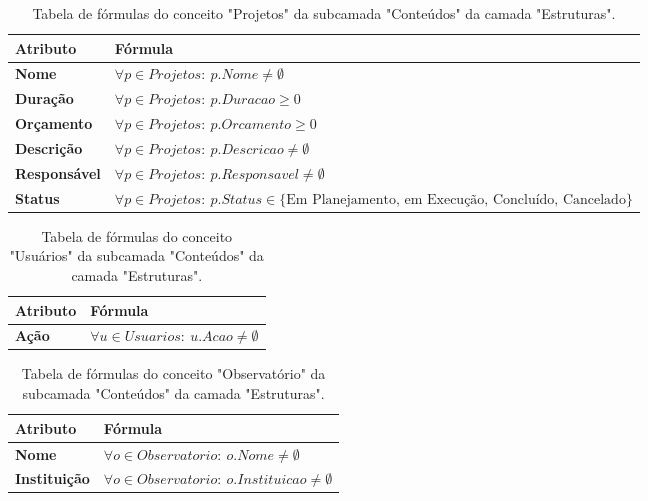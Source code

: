 \begin{apendicesenv}
\begin{table}[H]
\centering
\caption{Tabela de fórmulas do conceito "Projetos" da subcamada "Conteúdos" da camada "Estruturas".}
\begin{tabularx}{\textwidth}{|l|X|}
\hline
\textbf{Atributo} & \textbf{Fórmula} \\ \hline
\textbf{Nome} & $\forall p \in Projetos:\ p.Nome \neq \emptyset$ \\ \hline
\textbf{Duração} & $\forall p \in Projetos:\ p.Duracao \ge 0$ \\ \hline
\textbf{Orçamento} & $\forall p \in Projetos:\ p.Orcamento \ge 0$ \\ \hline
\textbf{Descrição} & $\forall p \in Projetos:\ p.Descricao \neq \emptyset$ \\ \hline
\textbf{Responsável} & $\forall p \in Projetos:\ p.Responsavel \neq \emptyset$ \\ \hline
\textbf{Status} & $\forall p \in Projetos:\ p.Status \in \{\text{Em Planejamento, em Execução, Concluído, Cancelado}\}$ \\ \hline
\end{tabularx}
\end{table}

\begin{table}[H]
\centering
\caption{Tabela de fórmulas do conceito "Usuários" da subcamada "Conteúdos" da camada "Estruturas".}
\begin{tabularx}{\textwidth}{|l|X|}
\hline
\textbf{Atributo} & \textbf{Fórmula} \\ \hline
\textbf{Ação} & $\forall u \in Usuarios:\ u.Acao \neq \emptyset$ \\ \hline
\end{tabularx}
\end{table}

\begin{table}[H]
\centering
\caption{Tabela de fórmulas do conceito "Observatório" da subcamada "Conteúdos" da camada "Estruturas".}
\begin{tabularx}{\textwidth}{|l|X|}
\hline
\textbf{Atributo} & \textbf{Fórmula} \\ \hline
\textbf{Nome} & $\forall o \in Observatorio:\ o.Nome \neq \emptyset$ \\ \hline
\textbf{Instituição} & $\forall o \in Observatorio:\ o.Instituicao \neq \emptyset$ \\ \hline
\end{tabularx}
\end{table}


\end{apendicesenv}
